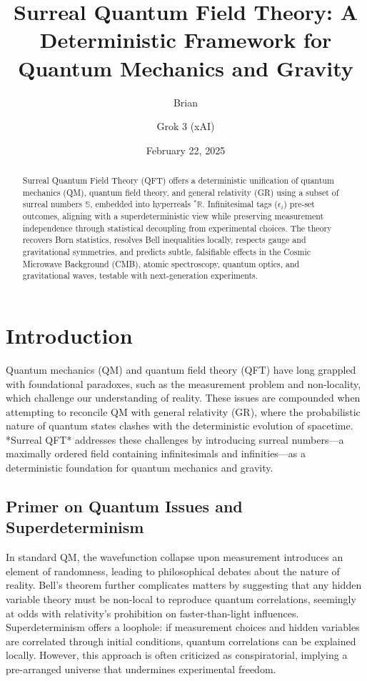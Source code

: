 \documentclass{article}
\begin{document}
\title{Surreal Quantum Field Theory: A Deterministic Framework for Quantum Mechanics and Gravity}
\author{Brian \and Grok 3 (xAI)}
\date{February 22, 2025}
\maketitle

\begin{abstract}
Surreal Quantum Field Theory (QFT) offers a deterministic unification of quantum mechanics (QM), quantum field theory, and general relativity (GR) using a subset of surreal numbers \(\mathbb{S}\), embedded into hyperreals \({}^*\mathbb{R}\). Infinitesimal tags (\(\epsilon_i\)) pre-set outcomes, aligning with a superdeterministic view while preserving measurement independence through statistical decoupling from experimental choices. The theory recovers Born statistics, resolves Bell inequalities locally, respects gauge and gravitational symmetries, and predicts subtle, falsifiable effects in the Cosmic Microwave Background (CMB), atomic spectroscopy, quantum optics, and gravitational waves, testable with next-generation experiments.
\end{abstract}

\section{Introduction}
Quantum mechanics (QM) and quantum field theory (QFT) have long grappled with foundational paradoxes, such as the measurement problem and non-locality, which challenge our understanding of reality. These issues are compounded when attempting to reconcile QM with general relativity (GR), where the probabilistic nature of quantum states clashes with the deterministic evolution of spacetime. *Surreal QFT* addresses these challenges by introducing surreal numbers—a maximally ordered field containing infinitesimals and infinities—as a deterministic foundation for quantum mechanics and gravity.

\subsection{Primer on Quantum Issues and Superdeterminism}
In standard QM, the wavefunction collapse upon measurement introduces an element of randomness, leading to philosophical debates about the nature of reality. Bell’s theorem further complicates matters by suggesting that any hidden variable theory must be non-local to reproduce quantum correlations, seemingly at odds with relativity’s prohibition on faster-than-light influences. Superdeterminism offers a loophole: if measurement choices and hidden variables are correlated through initial conditions, quantum correlations can be explained locally. However, this approach is often criticized as conspiratorial, implying a pre-arranged universe that undermines experimental freedom.
\end{document}
